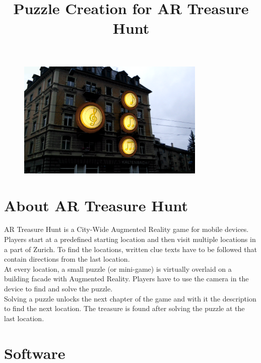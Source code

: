 \documentclass[a4paper]{article}
\begin{document}
\title{\vspace{-2em}Puzzle Creation for AR Treasure Hunt
\vspace{-2em}}
\author{}
\date{}
\maketitle
\thispagestyle{fancy}

\begin{figure}[h]
	\centering
	\includegraphics[width=0.8\textwidth]{figures/title}
\end{figure}


\section{About AR Treasure Hunt}

AR Treasure Hunt is a City-Wide Augmented Reality game for mobile devices.\\

Players start at a predefined starting location and then visit multiple locations in a part of Zurich. To find the locations, written clue texts have to be followed that contain directions from the last location.\\

At every location, a small puzzle (or mini-game) is virtually overlaid on a building facade with Augmented Reality. Players have to use the camera in the device to find and solve the puzzle.\\

Solving a puzzle unlocks the next chapter of the game and with it the description to find the next location. The treasure is found after solving the puzzle at the last location.

\section{Software}
\end{document}
